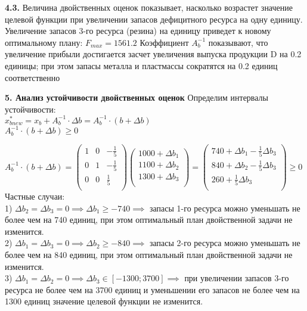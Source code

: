 {\bf4.3.}
    Величина двойственных оценок показывает, насколько возрастет значение целевой функции при увеличении запасов дефицитного ресурса на одну единицу.\\
    Увеличение запасов 3-го ресурса (резина) на единицу приведет к новому оптимальному плану: $F_{max} = 1561.2$
    Коэффициент $A_{b}^{-1}$ показывают, что увеличение прибыли достигается засчет увеличения выпуска продукции D на 0.2 единицы; при этом запасы металла и пластмассы сократятся на 0.2 единиц соответственно 

{\bf5. Анализ устойчивости двойственных оценок}
\newline
Определим интервалы устойчивости:\\
$x_{b new}^{*} = x_{b} + A_{b}^{-1} \cdot \Delta b = A_{b}^{-1} \cdot (b + \Delta b)$\\
$A_{b}^{-1} \cdot (b + \Delta b) \ge 0$

$A_{b}^{-1} \cdot (b + \Delta b) = \begin{pmatrix}
1 & 0 & -\frac{1}{5} \\
0 & 1 & -\frac{1}{5}\\
0 & 0 & \frac{1}{5}\\
\end{pmatrix}
\begin{pmatrix}
1000 + \Delta b_1 \\
1100 + \Delta b_2 \\
1300 + \Delta b_3 \\
\end{pmatrix} = \begin{pmatrix}
740 + \Delta b_1 - \frac{1}{5} \Delta b_3 \\
840 + \Delta b_2 - \frac{1}{5} \Delta b_3 \\
260 + \frac{1}{5} \Delta b_3 \\
\end{pmatrix} \ge 0$\\
Частные случаи:\\
1) $\Delta b_2 = \Delta b_3 = 0 \implies \Delta b_1 \ge -740 \implies$ запасы 1-го ресурса можно уменьшать не более чем на 740 единиц, при этом оптимальный план двойственной задачи не изменится.\\
2) $\Delta b_1 = \Delta b_3 = 0 \implies \Delta b_2 \ge -840 \implies$ запасы 2-го ресурса можно уменьшать не более чем на 840 единиц, при этом оптимальный план двойственной задачи не изменится.\\
3) $\Delta b_1 = \Delta b_2 = 0 \implies \Delta b_3 \in [-1300; 3700] \implies$ при увеличении запасов 3-го ресурса не более чем на 3700 единиц и уменьшении его запасов не более чем на 1300 единиц значение целевой функции не изменится.\\

